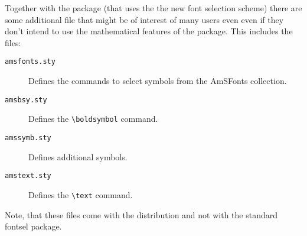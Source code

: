 Together with the \AmSLaTeX{} package (that uses the the new font
 selection scheme) there are some additional file that might be of
 interest of many users even even if they don't intend to use the
 mathematical features of the \AmSLaTeX{} package. This includes the
 files:
\begin{description}
  \item[\tt amsfonts.sty]
   Defines the commands to select symbols from the AmSFonts
   collection.
  \item[\tt amsbsy.sty]
   Defines the \verb+\boldsymbol+ command.
  \item[\tt amssymb.sty]
   Defines additional \AmSTeX{} symbols.
  \item[\tt amstext.sty]
   Defines the \AmSTeX{} \verb+\text+ command.
\end{description}
Note, that these files come with the \AmSLaTeX{} distribution and not
 with the standard fontsel package.



